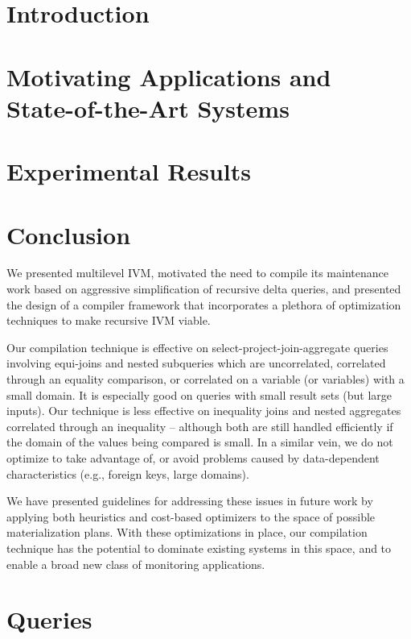 \documentclass{sig-alternate}
\begin{document}
\section{Introduction}
\label{sec:introduction}


\section{Motivating Applications and\\State-of-the-Art Systems}
\label{sec:sota}
%
%






\section{Experimental Results}
\label{sec:experiments}



\section{Conclusion}
\label{sec:conclusion}
We presented multilevel IVM, motivated the need to compile its maintenance work based on aggressive simplification of recursive delta queries, and presented the design of a compiler framework that incorporates a plethora of optimization techniques to make recursive IVM viable.

Our compilation technique is effective on select-project-join-aggregate queries involving equi-joins and nested subqueries which are uncorrelated, correlated through an equality comparison, or correlated on a variable (or variables) with a small domain.  It is especially good on queries with small result sets (but large inputs).
%
Our technique is less effective on inequality joins and nested aggregates correlated through an inequality -- although both are still handled efficiently if the domain of the values being compared is small.  In a similar vein, we do not optimize to take advantage of, or avoid problems caused by data-dependent characteristics (e.g., foreign keys, large domains). 

We have presented guidelines for addressing these issues in future work by applying both heuristics and cost-based optimizers to the space of possible materialization plans.  With these optimizations in place, our compilation technique has the potential to dominate existing systems in this space, and to enable a broad new class of monitoring applications.

\footnotesize{

}

\appendix
\vspace{-1mm}
\section{Queries}
\label{app:queries}
\vspace{-4mm}

\end{document}

